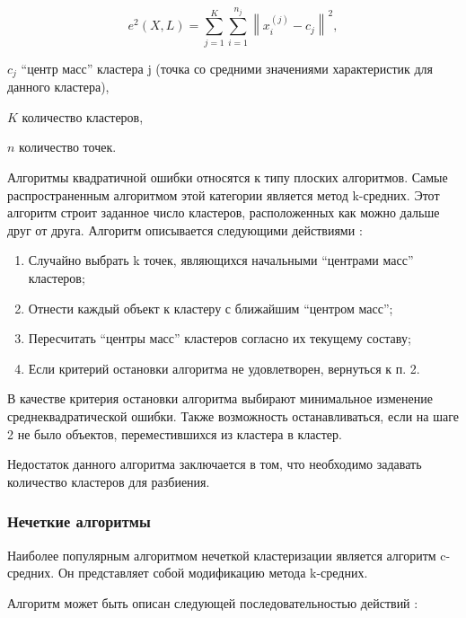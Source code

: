 \begin{equation}
\label{eq:e2}
e^2\left(X,L\right)=\sum_{j=1}^{K}\sum_{i=1}^{n_j}\left \| x_i^{(j)}-c_j \right \|^2,
\end{equation}
\begin{eqexpl}[15mm]
\item{$c_j$} ``центр масс'' кластера j (точка со средними значениями характеристик для данного кластера),
\item{$K$} количество кластеров,
\item{$n$} количество точек.
\end{eqexpl}

Алгоритмы квадратичной ошибки относятся к типу плоских алгоритмов. Самые распространенным алгоритмом этой категории является метод k-средних. Этот алгоритм строит заданное число кластеров, расположенных как можно дальше друг от друга. Алгоритм описывается следующими действиями \cite{clasters}:

\begin{enumerate}[leftmargin=1.6\parindent]
\item Случайно выбрать k точек, являющихся начальными ``центрами масс'' кластеров;
\item Отнести каждый объект к кластеру с ближайшим ``центром масс'';
\item Пересчитать ``центры масс'' кластеров согласно их текущему составу;
\item Если критерий остановки алгоритма не удовлетворен, вернуться к п. 2.
\end{enumerate}

В качестве критерия остановки алгоритма выбирают минимальное изменение среднеквадратической ошибки. Также возможность останавливаться, если на шаге 2 не было объектов, переместившихся из кластера в кластер. \cite{clasters}

Недостаток данного алгоритма заключается в том, что необходимо задавать количество кластеров для разбиения. \cite{clasters}

\subsubsection{Нечеткие алгоритмы}
Наиболее популярным алгоритмом нечеткой кластеризации является алгоритм c-средних. Он представляет собой модификацию метода k-средних. \cite{clasters}

Алгоритм может быть описан следующей последовательностью действий \cite{clasters}:

